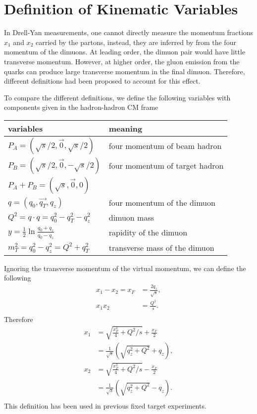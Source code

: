 \documentclass[../main.tex]{subfiles}
\begin{document}
\chapter{Definition of Kinematic Variables}
\label{a_ch:kinematic}
In Drell-Yan measurements, one cannot directly measure the momentum fractions
$x_1$ and $x_2$ carried by the partons, instead, they are inferred by from the
four momentum of the dimuons. At leading order, the dimuon pair would have little
transverse momentum. However, at higher order, the gluon emission from the quarks
can produce large transverse momentum in the final dimuon. Therefore, different
definitions had been proposed to account for this effect.

To compare the different definitions, we define the following variables with
components given in the hadron-hadron CM frame
\begin{table}[h!]
	\centering
	\begin{tabular}{ll}
		variables                                                 & meaning                        \\ \hline
		$P_A = \left(   \sqrt{s}/2, \vec{0}, \sqrt{s}/2 \right)$  & four momentum of beam hadron   \\
		$P_B = \left( \sqrt{s}/2, \vec{0},   -\sqrt{s}/2 \right)$ & four momentum of target hadron \\
		$P_A+P_B=\left(\sqrt{s},\vec{0},0\right)$                 &                                \\
		$q = \left(q_0, \vec{q_T}, q_z\right)$                    & four momentum of the dimuon    \\
		$Q^2=q\cdot q=q_0^2-q_T^2-q_z^2$                          & dimuon mass                    \\
		$y=\frac{1}{2}\ln \frac{q_0 +   q_z}{q_0-q_z}$            & rapidity of the dimuon         \\
		$m_T^2 = q_0^2 - q_z^2=Q^2+q_T^2$                         & transverse mass of the dimuon
	\end{tabular}
\end{table}

Ignoring the transverse momentum of the virtual momentum, we can define the following
\begin{equation}
	\begin{split}
		x_1-x_2=x_F &= \frac{2q_z}{\sqrt{s}},\\
		x_1x_2 &= \frac{Q^2}{s}.\\
	\end{split}
\end{equation}
Therefore
\begin{equation}
	\begin{split}
		x_1 &= \sqrt{\frac{x_F^2}{4}+Q^2/s}+\frac{x_F}{2} \\
		&=\frac{1}{\sqrt{s}}\left(\sqrt{q_z^2+Q^2}+q_z \right),\\
		x_2 &= \sqrt{\frac{x_F^2}{4}+Q^2/s}-\frac{x_F}{2} \\
		&=\frac{1}{\sqrt{s}}\left(\sqrt{q_z^2+Q^2}-q_z \right).\\
	\end{split}
\end{equation}
This definition has been used in previous fixed target experiments.
\end{document}
